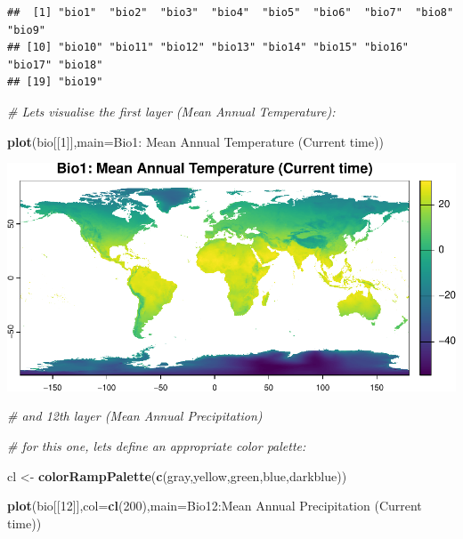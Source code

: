 \documentclass[
]{article}
\newenvironment{Shaded}{\begin{snugshade}}{\end{snugshade}}
\newcommand{\AttributeTok}[1]{\textcolor[rgb]{0.13,0.29,0.53}{#1}}
\newcommand{\CommentTok}[1]{\textcolor[rgb]{0.56,0.35,0.01}{\textit{#1}}}
\newcommand{\DecValTok}[1]{\textcolor[rgb]{0.00,0.00,0.81}{#1}}
\newcommand{\FunctionTok}[1]{\textcolor[rgb]{0.13,0.29,0.53}{\textbf{#1}}}
\newcommand{\NormalTok}[1]{#1}
\newcommand{\OtherTok}[1]{\textcolor[rgb]{0.56,0.35,0.01}{#1}}
\newcommand{\StringTok}[1]{\textcolor[rgb]{0.31,0.60,0.02}{#1}}
\begin{document}
\begin{verbatim}
##  [1] "bio1"  "bio2"  "bio3"  "bio4"  "bio5"  "bio6"  "bio7"  "bio8"  "bio9" 
## [10] "bio10" "bio11" "bio12" "bio13" "bio14" "bio15" "bio16" "bio17" "bio18"
## [19] "bio19"
\end{verbatim}

\begin{Shaded}
\begin{Highlighting}[]
\CommentTok{\# Let\textquotesingle{}s visualise the first layer (Mean Annual Temperature):}


\FunctionTok{plot}\NormalTok{(bio[[}\DecValTok{1}\NormalTok{]],}\AttributeTok{main=}\StringTok{\textquotesingle{}Bio1: Mean Annual Temperature (Current time)\textquotesingle{}}\NormalTok{)}
\end{Highlighting}
\end{Shaded}

\includegraphics{sdm_R_files/figure-latex/unnamed-chunk-2-1.pdf}

\begin{Shaded}
\begin{Highlighting}[]
\CommentTok{\# and 12th layer (Mean Annual Precipitation)}

\CommentTok{\# for this one, let\textquotesingle{}s define an appropriate color palette:}

\NormalTok{cl }\OtherTok{\textless{}{-}} \FunctionTok{colorRampPalette}\NormalTok{(}\FunctionTok{c}\NormalTok{(}\StringTok{\textquotesingle{}gray\textquotesingle{}}\NormalTok{,}\StringTok{\textquotesingle{}yellow\textquotesingle{}}\NormalTok{,}\StringTok{\textquotesingle{}green\textquotesingle{}}\NormalTok{,}\StringTok{\textquotesingle{}blue\textquotesingle{}}\NormalTok{,}\StringTok{\textquotesingle{}darkblue\textquotesingle{}}\NormalTok{))}


\FunctionTok{plot}\NormalTok{(bio[[}\DecValTok{12}\NormalTok{]],}\AttributeTok{col=}\FunctionTok{cl}\NormalTok{(}\DecValTok{200}\NormalTok{),}\AttributeTok{main=}\StringTok{\textquotesingle{}Bio12:Mean Annual Precipitation (Current time)\textquotesingle{}}\NormalTok{)}
\end{Highlighting}
\end{Shaded}
\end{document}
